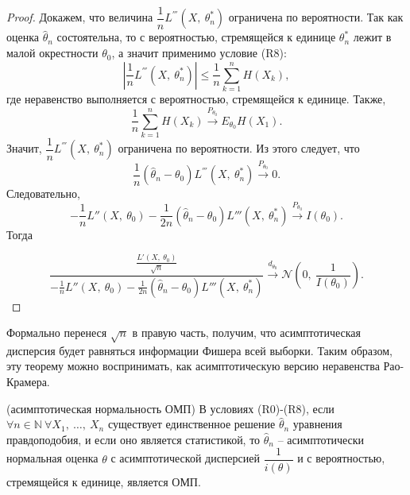 \begin{proof}
    Докажем, что величина $\displaystyle \dfrac{1}{n} L^{'''}\left( X,\ \theta _{n}^{*}\right)$ ограничена по вероятности. Так как оценка $\displaystyle \hat{\theta }_{n}$ состоятельна, то с вероятностью, стремящейся к единице $\displaystyle \theta _{n}^{*}$ лежит в малой окрестности $\displaystyle \theta _{0}$, а значит применимо условие (R8):
    \begin{equation*}
        \left| \dfrac{1}{n} L^{'''}\left( X,\ \theta _{n}^{*}\right)\right| \leq \dfrac{1}{n}\sum _{k=1}^{n} H( X_{k}) ,
    \end{equation*}
    где неравенство выполняется с вероятностью, стремящейся к единице. Также,
    \begin{equation*}
        \dfrac{1}{n}\sum _{k=1}^{n} H( X_{k})\xrightarrow{P_{\theta _{0}}} E_{\theta _{0}} H( X_{1}) .
    \end{equation*}
    Значит, $\displaystyle \dfrac{1}{n} L^{'''}\left( X,\ \theta _{n}^{*}\right)$ ограничена по вероятности. Из этого следует, что
    \begin{equation*}
        \frac{1}{n}(\hat{\theta }_{n} -\theta _{0}) L^{'''}\left( X,\ \theta _{n}^{*}\right)\xrightarrow{P_{\theta _{0}}} 0.
    \end{equation*}
    Следовательно,
    \begin{equation*}
        -\frac{1}{n} L''( X,\ \theta _{0}) -\frac{1}{2n}(\hat{\theta }_{n} -\theta _{0}) L'''\left( X,\ \theta _{n}^{*}\right)\xrightarrow{P_{\theta _{0}}} I( \theta _{0}) .
    \end{equation*}
    Тогда
    
    \begin{equation*}
        \dfrac{\frac{L'( X,\ \theta _{0})}{\sqrt{n}}}{-\frac{1}{n} L''( X,\ \theta _{0}) -\frac{1}{2n}(\hat{\theta }_{n} -\theta _{0}) L'''\left( X,\ \theta _{n}^{*}\right)}\xrightarrow{d_{\theta _{0}}}\mathcal{N}\left( 0,\ \dfrac{1}{I( \theta _{0})}\right) .
    \end{equation*}
\end{proof}
\begin{note}
    Формально перенеся $\displaystyle \sqrt{n}$ в правую часть, получим, что асимптотическая дисперсия будет равняться информации Фишера всей выборки. Таким образом, эту теорему можно воспринимать, как асимптотическую версию неравенства Рао-Крамера.
\end{note}
\begin{corollary}
    (асимптотическая нормальность ОМП) В условиях (R0)-(R8), если $\displaystyle \forall n\in \mathbb{N} \ \forall X_{1} ,\ \dotsc ,\ X_{n}$ существует единственное решение $\displaystyle \hat{\theta }_{n}$ уравнения правдоподобия, и если оно является статистикой, то $\displaystyle \hat{\theta }_{n}$ -- асимптотически нормальная оценка $\displaystyle \theta $ с асимптотической дисперсией $\displaystyle \dfrac{1}{i( \theta )}$ и с вероятностью, стремящейся к единице, является ОМП. 
\end{corollary}
